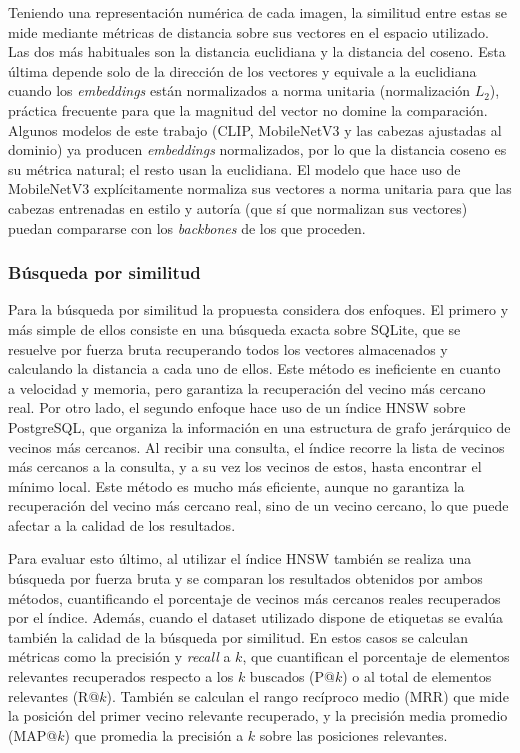 Teniendo una representación numérica de cada imagen, la similitud entre estas
se mide mediante métricas de distancia sobre sus vectores en el espacio
utilizado. Las dos más habituales son la distancia euclidiana y la distancia
del coseno. Esta última depende solo de la dirección de los vectores y equivale
a la euclidiana cuando los \textit{embeddings} están normalizados a norma
unitaria (normalización $L_2$), práctica frecuente para que la magnitud del
vector no domine la comparación. Algunos modelos de este trabajo (CLIP,
MobileNetV3 y las cabezas ajustadas al dominio) ya producen \textit{embeddings}
normalizados, por lo que la distancia coseno es su métrica natural; el resto
usan la euclidiana. El modelo que hace uso de MobileNetV3 explícitamente
normaliza sus vectores a norma unitaria para que las cabezas entrenadas en
estilo y autoría (que sí que normalizan sus vectores) puedan compararse con los
\textit{backbones} de los que proceden.

\subsubsection{Búsqueda por similitud}
\label{subsubsec:tools-similarity-search}
Para la búsqueda por similitud la propuesta considera dos enfoques. El primero
y más simple de ellos consiste en una búsqueda exacta sobre SQLite, que se
resuelve por fuerza bruta recuperando todos los vectores almacenados y
calculando la distancia a cada uno de ellos. Este método es ineficiente en
cuanto a velocidad y memoria, pero garantiza la recuperación del vecino más
cercano real. Por otro lado, el segundo enfoque hace uso de un índice HNSW
sobre PostgreSQL, que organiza la información en una estructura de grafo
jerárquico de vecinos más cercanos. Al recibir una consulta, el índice recorre
la lista de vecinos más cercanos a la consulta, y a su vez los vecinos de
estos, hasta encontrar el mínimo local. Este método es mucho más eficiente,
aunque no garantiza la recuperación del vecino más cercano real, sino de un
vecino cercano, lo que puede afectar a la calidad de los resultados.

Para evaluar esto último, al utilizar el índice HNSW también se realiza una
búsqueda por fuerza bruta y se comparan los resultados obtenidos por ambos
métodos, cuantificando el porcentaje de vecinos más cercanos reales recuperados
por el índice. Además, cuando el dataset utilizado dispone de etiquetas se
evalúa también la calidad de la búsqueda por similitud. En estos casos se
calculan métricas como la precisión y \textit{recall} a $k$, que cuantifican el
porcentaje de elementos relevantes recuperados respecto a los $k$ buscados
(P@$k$) o al total de elementos relevantes (R@$k$). También se calculan el
rango recíproco medio (MRR) que mide la posición del primer vecino relevante
recuperado, y la precisión media promedio (MAP@$k$) que promedia la precisión a
$k$ sobre las posiciones relevantes.

